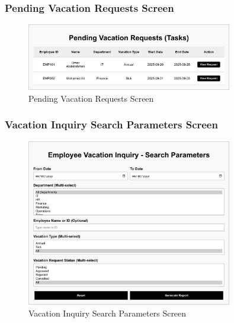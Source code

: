 \documentclass[12pt,a4paper]{article}
\begin{document}
\subsubsection{Pending Vacation Requests Screen}
\begin{figure}[H]
\centering
\includegraphics[width=0.8\textwidth]{Wireframes/Pending-Vacation-Requests/Pending-Vacation-Requests-1.png}
\caption{Pending Vacation Requests Screen}
\label{fig:pending-vacation-requests-screen}
\end{figure}

\subsubsection{Vacation Inquiry Search Parameters Screen}
\begin{figure}[H]
\centering
\includegraphics[width=0.8\textwidth]{Wireframes/Employee-Vacation-Inquiry-Search-Parameters/Employee-Vacation-Inquiry-Search-Parameters-1.png}
\caption{Vacation Inquiry Search Parameters Screen}
\label{fig:inquiry-search-params-screen}
\end{figure}
\end{document}
